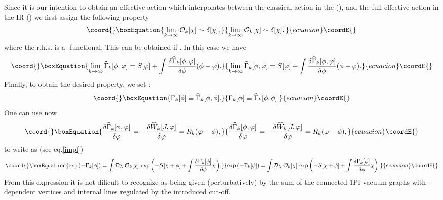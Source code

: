 \documentclass[a4paper,12pt]{article}
\begin{document}
Since it is our intention to obtain an effective action which interpolates between the classical action \coordHE{} in the \coordHE{} (\coordHE{}), and the full effective action \myHighlight{$\Gamma[\phi]$}\coordHE{} in the IR (\coordHE{}) we first assign \coordHE{} the following property
\begin{equation}\coord{}\boxEquation{
                  \lim_{k\to\infty} {\mathcal O}_k[\chi] \sim \delta [\chi],
}{
                  \lim_{k\to\infty} {\mathcal O}_k[\chi] \sim \delta [\chi],
}{ecuacion}\coordE{}\end{equation}          
where the r.h.s. is a \myHighlight{$\delta$}\coordHE{}-functional. This can be obtained if \coordHE{}. In this case we have
\begin{equation}\coord{}\boxEquation{
                  \lim_{k\to\infty} \widehat{\Gamma}_k[\phi,\varphi] = S[\varphi] + \int\frac{\delta \widehat{\Gamma}_k[\phi,\varphi]}{\delta \phi}(\phi-\varphi).
}{
                  \lim_{k\to\infty} \widehat{\Gamma}_k[\phi,\varphi] = S[\varphi] + \int\frac{\delta \widehat{\Gamma}_k[\phi,\varphi]}{\delta \phi}(\phi-\varphi).
}{ecuacion}\coordE{}\end{equation}
Finally, to obtain the desired property, we set \myHighlight{$\varphi=\phi$}\coordHE{}:
\begin{equation}\coord{}\boxEquation{ 
                  \Gamma_k[\phi]\equiv\widehat{\Gamma}_k[\phi,\phi].
}{ 
                  \Gamma_k[\phi]\equiv\widehat{\Gamma}_k[\phi,\phi].
}{ecuacion}\coordE{}\end{equation}
One can use now
\begin{equation}\coord{}\boxEquation{\label{deriv}
           \frac{\delta \widehat{\Gamma}_k[\phi,\varphi]}{\delta\varphi}=-\frac{\delta \widehat{W}_k[J,\varphi]}{\delta\varphi}=R_k(\varphi-\phi),
}{\frac{\delta \widehat{\Gamma}_k[\phi,\varphi]}{\delta\varphi}=-\frac{\delta \widehat{W}_k[J,\varphi]}{\delta\varphi}=R_k(\varphi-\phi),
}{ecuacion}\coordE{}\end{equation}
to write \coordHE{} as (see eq.\eqref{impl})
\begin{equation}\coord{}\boxEquation{
                \exp{\left(-\Gamma_k[\phi]\right)}=\int{\mathcal D}\chi\,{\mathcal O}_k[\chi]\,\exp{\left(-S[\chi+\phi]+\int\frac{\delta \Gamma_k[\phi]}{\delta \phi}\chi\right)}.
}{
                \exp{\left(-\Gamma_k[\phi]\right)}=\int{\mathcal D}\chi\,{\mathcal O}_k[\chi]\,\exp{\left(-S[\chi+\phi]+\int\frac{\delta \Gamma_k[\phi]}{\delta \phi}\chi\right)}.
}{ecuacion}\coordE{}\end{equation}
From this expression it is not dificult to recognize \coordHE{} as being given (perturbatively) by the sum of the connected 1PI vacuum graphs with \myHighlight{$\phi$}\coordHE{}-dependent vertices and internal lines regulated by the introduced cut-off. 
\end{document}
